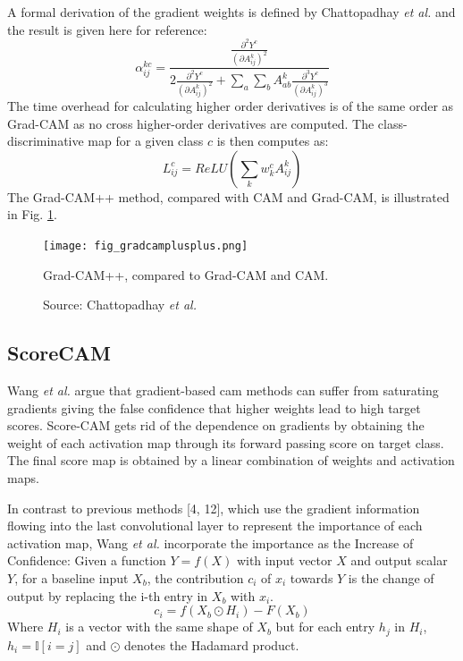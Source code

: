 A formal derivation of the gradient weights is defined by Chattopadhay \textit{et al.} \cite{chattopadhay2018grad} and the result is given here for reference:
\begin{equation}
    \alpha_{ij}^{kc} = \frac{\frac{\partial^{2}{Y^c}}{\left( \partial{A_{ij}^{k}} \right)^2}}{2\frac{\partial^{2}{Y^c}}{\left( \partial{A_{ij}^{k}} \right)^2} + \sum_a \sum_b A_{ab}^{k} {\frac{\partial^{3}{Y^c}}{\left( \partial{A_{ij}^{k}} \right)^3}} }
\end{equation}
The time overhead for calculating higher order derivatives is of the same order as Grad-CAM as no cross higher-order derivatives are computed. The class-discriminative map for a given class $c$ is then computes as:
\begin{equation}
    L_{ij}^{c} = ReLU \left( \sum_{k}w_{k}^{c} A_{ij}^{k} \right)
\end{equation}
The Grad-CAM++ method, compared with CAM and Grad-CAM, is illustrated in Fig. \ref{fig:gradcamplusplus}.
\begin{figure}[ht]
    \begin{center}       
    \texttt{[image: fig\_gradcamplusplus.png]}
    \caption[Grad-CAM++]{Grad-CAM++, compared to Grad-CAM and CAM.}
    \caption*{Source: Chattopadhay \textit{et al.} \cite{chattopadhay2018grad}}
    \label{fig:gradcamplusplus}
    \end{center}
\end{figure}

\subsection{ScoreCAM}
Wang \textit{et al.} \cite{wang2020score} argue that gradient-based \acrshort{cam} methods can suffer from saturating gradients giving the false confidence that higher weights lead to high target scores. Score-CAM gets rid of the dependence on gradients by obtaining the weight of each activation map through its forward passing score on target class. The final score map is obtained by a linear combination of weights and activation maps.

In contrast to previous methods [4, 12], which use the gradient information flowing into the last convolutional layer to represent the importance of each activation map, Wang \textit{et al.} incorporate the importance as the Increase of Confidence: Given a function $Y = f(X)$ with input vector $X$ and output scalar $Y$, for a baseline input $X_b$, the contribution $c_i$ of $x_i$ towards $Y$ is the change of output by replacing the i-th entry in $X_b$ with $x_i$.
\begin{equation}
    c_i = f(X_b \odot H_i) - F(X_b)
\end{equation}
Where $H_i$ is a vector with the same shape of $X_b$ but for each entry $h_j$ in $H_i$, $h_i = \mathbb{I}[i=j]$ and $\odot$ denotes the Hadamard product.

